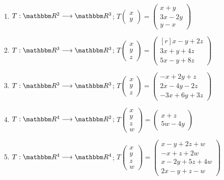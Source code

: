 \begin{enumerate}[resume]
    \item $T: \RR[2] \longrightarrow \RR[3]$; $T\begin{pmatrix*}x \\ y\end{pmatrix*}=\begin{pmatrix*}x+y \\ 3 x-2 y \\ y-x\end{pmatrix*}$
    \item $T: \RR[3] \longrightarrow \RR[3]$; $T\begin{pmatrix*}x \\ y \\ z\end{pmatrix*}=\begin{pmatrix*}[r]x-y+2 z \\ 3 x+y+4 z \\ 5 x-y+8 z\end{pmatrix*}$
    \item $T: \RR[3] \longrightarrow \RR[3]$; $T\begin{pmatrix*}x \\ y \\ z\end{pmatrix*}=\begin{pmatrix*}-x+2 y+z \\ 2 x-4 y-2 z \\ -3 x+6 y+3 z\end{pmatrix*}$
    \item $T: \RR[4] \longrightarrow \RR[2]$; $T\begin{pmatrix*}x \\ y \\ z \\ w\end{pmatrix*}=\begin{pmatrix*}x+z \\ 5 w-4 y\end{pmatrix*}$
    \item $T: \RR[4] \longrightarrow \RR[4]$; $T\begin{pmatrix*}x \\ y \\ z \\ w\end{pmatrix*}=\begin{pmatrix*}x-y+2 z+w \\ -x+z+2 w \\ x-2 y+5 z+4 w \\ 2 x-y+z-w\end{pmatrix*}$

\end{enumerate}
